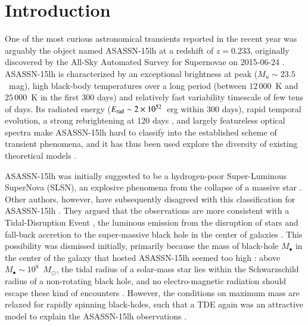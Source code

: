 \documentclass[traditabstract]{aa}
\newcommand{\Msun}{$M_\odot$}
\begin{document}
\section{Introduction}
\label{sec:Intro}

One of the most curious astronomical transients reported in the recent year was arguably the object named ASASSN-15lh at a redshift of $z=0.233$, originally discovered by the All-Sky Automated Survey for Supernovae \citep[ASAS-SN][]{2014ApJ...788...48S} on 2015-06-24 \citep{2015ATel.7642....1N}. ASASSN-15lh is characterized by an exceptional brightness at peak ($M_u\sim23.5$~mag), high black-body temperatures over a long period (between $12\,000$~K and $25\,000$~K in the first 300 days) and relatively fast variability timescale of few tens of days. Its radiated energy ($E_{\rm rad}\sim2\times10^{52}$~erg within 300 days), rapid temporal evolution, a strong rebrightening at 120 days \citep{2016ApJ...828....3B}, and largely featureless optical spectra \citep{2016Sci...351..257D, 2016NatAs...1E...2L} make ASASSN-15lh hard to classify into the established scheme of transient phenomena, and it has thus been used explore the diversity of existing theoretical models \citep[e.g.,][]{2015MNRAS.454.3311M, 2016ApJ...817L...8B}.

ASASSN-15lh was initially suggested \citep[][]{2016Sci...351..257D, 2017MNRAS.466.1428G} to be a hydrogen-poor Super-Luminous SuperNova (SLSN), an explosive phenomena from the collapse of a massive star \citep{2011Natur.474..487Q}. Other authors, however, have subsequently disagreed with this classification for ASASSN-15lh \citep{2016NatAs...1E...2L,  2017ApJ...836...25M}. They argued that the observations are more consistent with a Tidal-Disruption Event \citep[TDEs, e.g.,][]{2015JHEAp...7..148K}, the luminous emission from the disruption of stars and fall-back accretion to the super-massive black hole in the center of galaxies \citep[e.g.,][]{1988Natur.333..523R, 1989ApJ...346L..13E}. This possibility was dismissed initially, primarily because the mass of black-hole $M_\bullet$ in the center of the galaxy that hosted ASASSN-15lh seemed too high \citep{2015ATel.7776....1P}: above $M_\bullet\sim10^{8}$~\Msun, the tidal radius of a solar-mass star lies within the Schwarzschild radius of a non-rotating black hole, and no electro-magnetic radiation should escape these kind of encounters \citep{1975Natur.254..295H}. However, the conditions on maximum mass are relaxed for rapidly spinning black-holes, such that a TDE again was an attractive model to explain the ASASSN-15lh observations \citep{2016NatAs...1E...2L}.
\end{document}
